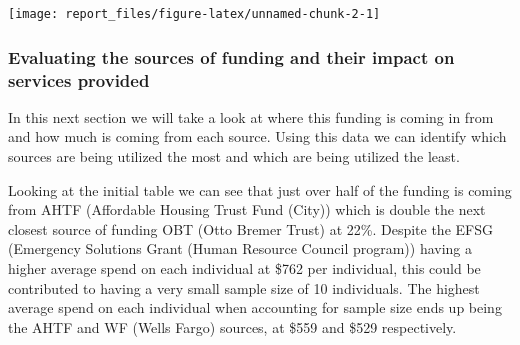 \documentclass[
]{article}
\begin{document}
\texttt{[image: report\_files/figure-latex/unnamed-chunk-2-1]}

\subsubsection{Evaluating the sources of funding and their impact on
services
provided}\label{evaluating-the-sources-of-funding-and-their-impact-on-services-provided}

In this next section we will take a look at where this funding is coming
in from and how much is coming from each source. Using this data we can
identify which sources are being utilized the most and which are being
utilized the least.

Looking at the initial table we can see that just over half of the
funding is coming from AHTF (Affordable Housing Trust Fund (City)) which
is double the next closest source of funding OBT (Otto Bremer Trust) at
22\%. Despite the EFSG (Emergency Solutions Grant (Human Resource
Council program)) having a higher average spend on each individual at
\$762 per individual, this could be contributed to having a very small
sample size of 10 individuals. The highest average spend on each
individual when accounting for sample size ends up being the AHTF and WF
(Wells Fargo) sources, at \$559 and \$529 respectively.
\end{document}
